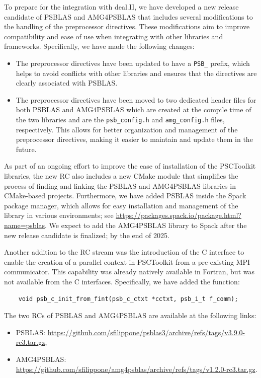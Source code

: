 \documentclass[a4paper,12pt]{article}
\begin{document}
To prepare for the integration with deal.II, we have developed a new release candidate of PSBLAS and AMG4PSBLAS
that includes several modifications to the handling of the preprocessor directives. These modifications aim
to improve compatibility and ease of use when integrating with other libraries and frameworks.
Specifically, we have made the following changes:
\begin{itemize}
    \item The preprocessor directives have been updated to have a \verb|PSB_| prefix, which helps to
          avoid conflicts with other libraries and ensures that the directives are clearly associated with PSBLAS.
    \item The preprocessor directives have been moved to two dedicated header files for both PSBLAS and AMG4PSBLAS
          which are created at the compile time of the two libraries and are the \verb|psb_config.h| and
          \verb|amg_config.h| files, respectively. This allows for better organization and management of the
          preprocessor directives, making it easier to maintain and update them in the future.
\end{itemize}

As part of an ongoing effort to improve the ease of installation of the PSCToolkit libraries, the new RC also
includes a new CMake module that simplifies the process of finding and linking the PSBLAS and AMG4PSBLAS libraries
in CMake-based projects. Furthermore, we have added PSBLAS inside the Spack package manager, which allows for
easy installation and management of the library in various environments; see \url{https://packages.spack.io/package.html?name=psblas}.
We expect to add the AMG4PSBLAS library to Spack after the new release candidate is finalized; by the end of 2025.

Another addition to the RC stream was the introduction of the C interface to enable the creation of a parallel context
in PSCToolkit from a pre-existing MPI communicator. This capability was already natively available in Fortran,
but was not available from the C interfaces. Specifically, we have added the function:
\begin{verbatim}
    void psb_c_init_from_fint(psb_c_ctxt *cctxt, psb_i_t f_comm);
\end{verbatim}

The two RCs of PSBLAS and AMG4PSBLAS are available at the following links:
\begin{itemize}
    \item PSBLAS: \url{https://github.com/sfilippone/psblas3/archive/refs/tags/v3.9.0-rc3.tar.gz},
    \item AMG4PSBLAS: \url{https://github.com/sfilippone/amg4psblas/archive/refs/tags/v1.2.0-rc3.tar.gz}.
\end{itemize}
\end{document}
